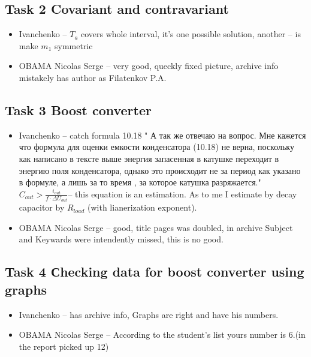 \documentclass[a4paper,landscape,11pt]{article}
\begin{document}
\subsection{Task 2 Covariant and contravariant}
\begin{itemize}
\item Ivanchenko -- $T_a$ covers whole interval, it's one possible solution, another -- is make $m_1$ symmetric
\item OBAMA Nicolas Serge -- very good, queckly fixed picture, archive info mistakely has author as Filatenkov P.A.
\end{itemize}

\subsection{Task 3 Boost converter}
\begin{itemize}
\item Ivanchenko -- catch formula 10.18 
" А так же отвечаю на вопрос. Мне кажется что формула для оценки емкости конденсатора (10.18) не верна, поскольку как написано в тексте выше энергия запасенная в катушке переходит в энергию поля конденсатора, однако это происходит не за период как указано в формуле, а лишь за то время , за которое катушка разряжается." 
$C_{out}> \frac{i_{out}}{f\cdot \Delta U_{out}}$-- this equation is an estimation.
As to me I estimate by decay capacitor by $R_{load}$ (with lianerization exponent).

\item OBAMA Nicolas Serge -- good, title pages was doubled, in archive Subject and Keywards were intendently missed, this is no good. 
\end{itemize}

\subsection{Task 4 Сhecking data for boost converter using graphs}
\begin{itemize}
\item Ivanchenko -- has archive info, Graphs are right and have his numbers.

\item OBAMA Nicolas Serge -- According to the student's list yours number is 6.(in the report picked up 12)
\end{itemize}
\end{document}
